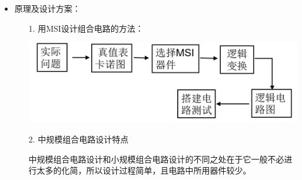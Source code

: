\documentclass[UTF8]{ctexart}
\begin{document}
\begin{enumerate}
\begin{itemize}
\begin{itemize}
\begin{itemize}
                              \end{itemize}
                    \end{itemize}
              \item 原理及设计方案：
                    \begin{itemize}
                        \item [1.]  用MSI设计组合电路的方法：
                              \begin{center}
                                \includegraphics[scale = 0.3]{1.png}
                              \end{center}
                        \item [2.]  中规模组合电路设计特点
                        
                        中规模组合电路设计和小规模组合电路设计的不同之处在于它一般不必进行太多的化简，所以设计过程简单，且电路中所用器件较少。  


\end{itemize}
\end{itemize}
\end{enumerate}
\end{document}
